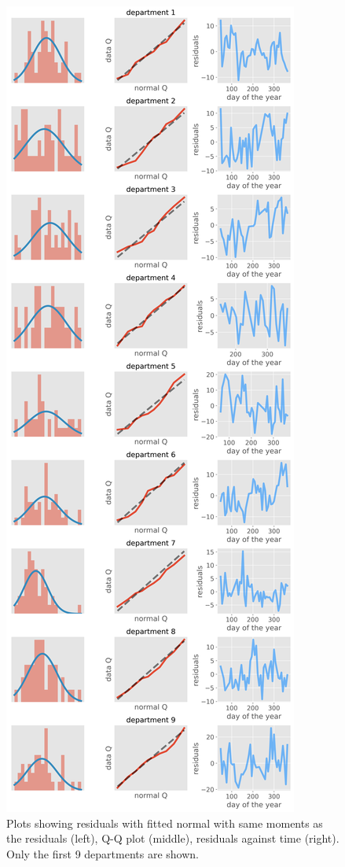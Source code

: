 \documentclass[paper=a4, fontsize=11pt]{scrartcl}
\begin{document}
    
\begin{figure}[!htb]
\centering
\includegraphics[width=.5\textwidth]{normal_approx_1.png}
\caption{Plots showing residuals with fitted normal with same moments as the residuals (left), Q-Q plot (middle), residuals against time (right). Only the first 9 departments are shown.}
\label{normal}
\end{figure}
\end{document}
